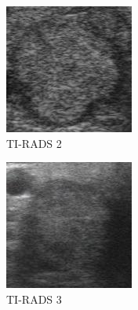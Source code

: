 \documentclass[12pt]{article}
\begin{document}
\begin{figure}[h]
\centering
\caption{Imagens utilizadas pela SVM.}
\begin{subfigure}[t]{.3\textwidth}
  \centering
  \includegraphics[width=.7\linewidth]{images/t_2_square.jpg}
  \caption{TI-RADS 2}
  \label{fig:t2s}
\end{subfigure}
\hfill
\begin{subfigure}[t]{.3\textwidth}
  \centering
  \includegraphics[width=.7\linewidth]{images/t_3_square.jpg}
  \caption{TI-RADS 3}
  \label{fig:t3s}
\end{subfigure}
\hfill
\begin{subfigure}[t]{.3\textwidth}
  \centering

\end{subfigure}
\end{figure}
\end{document}
